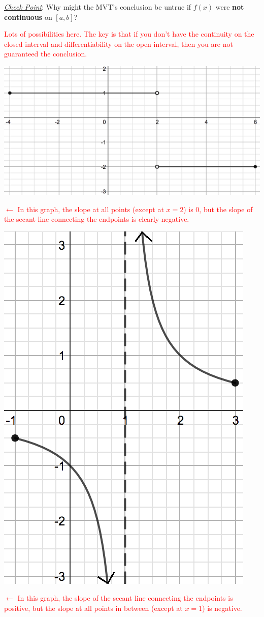 \documentclass[12pt]{report}
\begin{document}
\bigskip

\emph{\underline{Check Point}}: Why might the MVT's conclusion be untrue if $f(x)$ were \textbf{not continuous} on $[a,b]$?

\textcolor{red}{Lots of possibilities here.  The key is that if you don't have the continuity on the closed interval and differentiability on the open interval, then you are not guaranteed the conclusion.}

\bigskip

\begin{multicols}{2}
\includegraphics[scale=0.3]{MVT3.png}

\textcolor{red}{$\longleftarrow$ In this graph, the slope at all points (except at $x=2$) is 0, but the slope of the secant line connecting the endpoints is clearly negative.}
\end{multicols}

\bigskip

\begin{multicols}{2}
\includegraphics[scale=0.5]{MVT5edited.png}

\textcolor{red}{$\longleftarrow$ In this graph, the slope of the secant line connecting the endpoints is positive, but the slope at all points in between (except at $x=1$) is negative.}

\end{multicols}
\end{document}
